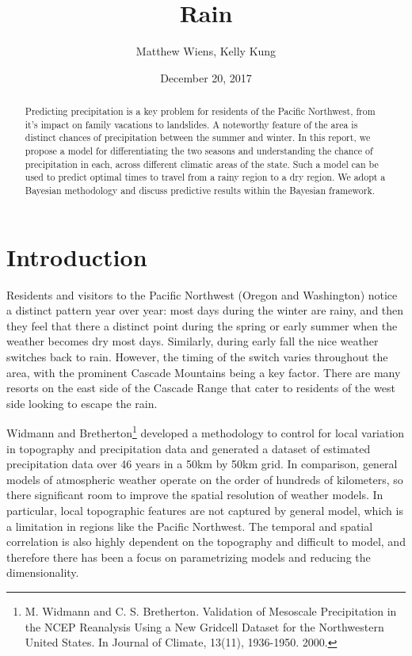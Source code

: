 \documentclass{article}
\begin{document}
\title{Rain}
\author{Matthew Wiens, Kelly Kung}
\date{December 20, 2017}
\maketitle
\begin{abstract}

Predicting precipitation is a key problem for residents of the Pacific Northwest, from it's impact on family vacations to landslides. A noteworthy feature of the area is distinct chances of precipitation between the summer and winter. In this report, we propose a model for differentiating the two seasons and understanding the chance of precipitation in each, across different climatic areas of the state. Such a model can be used to predict optimal times to travel from a rainy region to a dry region. We adopt a Bayesian methodology and  discuss predictive results within the Bayesian framework.  

\end{abstract}

\section{Introduction}

Residents and visitors to the Pacific Northwest (Oregon and Washington) notice a distinct pattern year over year: most days during the winter are rainy, and then they feel that there a distinct point during the spring or early summer when the weather becomes dry most days. Similarly, during early fall the nice weather switches back to rain.  However, the timing of the switch varies throughout the area, with the prominent Cascade Mountains being a key factor. There are many resorts on the east side of the Cascade Range that cater to residents of the west side looking to escape the rain. 

Widmann and Bretherton\footnote{M. Widmann and C. S. Bretherton. Validation of Mesoscale Precipitation in the NCEP Reanalysis Using a New Gridcell Dataset for the Northwestern United States. In Journal of Climate, 13(11), 1936-1950. 2000.} developed a methodology to control for local variation in topography and precipitation data and generated a dataset of estimated precipitation data over 46 years in a 50km by 50km grid.  In comparison, general models of atmospheric weather operate on the order of hundreds of kilometers, so there significant room to improve the spatial resolution of weather models.  In particular, local topographic features are not captured by general model, which is a limitation in regions like the Pacific Northwest. The temporal and spatial correlation is also highly dependent on the topography and difficult to model, and therefore there has been a focus on parametrizing models and reducing the dimensionality. 
\end{document}

